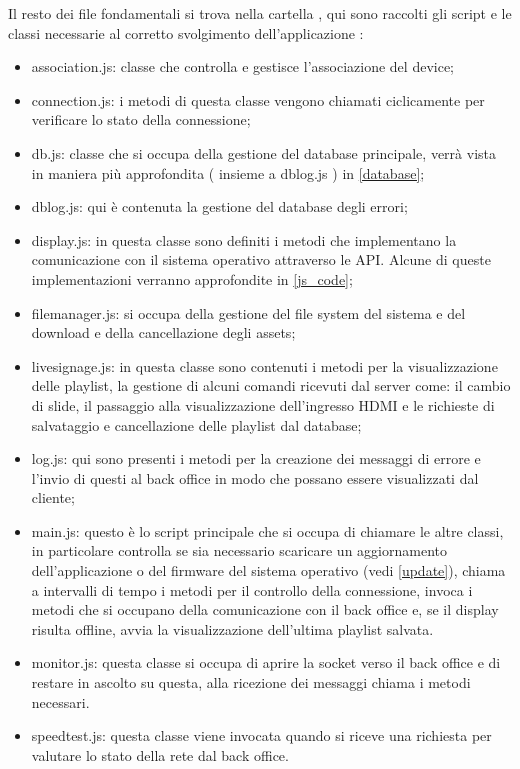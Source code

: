 Il resto dei file fondamentali si trova nella cartella , qui sono raccolti gli script e le classi necessarie al corretto svolgimento dell'applicazione :

\begin{itemize}
    \item association.js: classe che controlla e gestisce l'associazione del device;
    \item connection.js: i metodi di questa classe vengono chiamati ciclicamente per verificare lo stato della connessione;
    \item db.js: classe che si occupa della gestione del database principale, verrà vista in maniera più approfondita ( insieme a dblog.js ) in \ref*{database};
    \item dblog.js: qui è contenuta la gestione del database degli errori;
    \item display.js: in questa classe sono definiti i metodi che implementano la comunicazione con il sistema operativo attraverso le API. Alcune di queste implementazioni verranno approfondite in \ref*{js_code};
    \item filemanager.js: si occupa della gestione del file system del sistema e del download e della cancellazione degli assets;
    \item livesignage.js: in questa classe sono contenuti i metodi per la visualizzazione delle playlist, la gestione di alcuni comandi ricevuti dal server come: il cambio di slide, il passaggio alla visualizzazione dell'ingresso HDMI e le richieste di salvataggio e cancellazione delle playlist dal database;
    \item log.js: qui sono presenti i metodi per la creazione dei messaggi di errore e l'invio di questi al back office in modo che possano essere visualizzati dal cliente;
    \item main.js: questo è lo script principale che si occupa di chiamare le altre classi, in particolare controlla se sia necessario scaricare un aggiornamento dell'applicazione o del firmware del sistema operativo (vedi \ref*{update}), chiama a intervalli di tempo i metodi per il controllo della connessione, invoca i metodi che si occupano della comunicazione con il back office e, se il display risulta offline, avvia la visualizzazione dell'ultima playlist salvata.
    \item monitor.js: questa classe si occupa di aprire la socket verso il back office e di restare in ascolto su questa, alla ricezione dei messaggi chiama i metodi necessari.
    \item speedtest.js: questa classe viene invocata quando si riceve una richiesta per valutare lo stato della rete dal back office.
\end{itemize}


